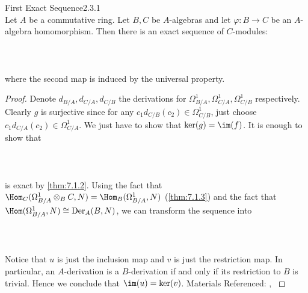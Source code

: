 \documentclass[a4paper]{article}
\begin{document}
\begin{thm}{First Exact Sequence}{2.3.1}\\
Let $A$ be a commutative ring. Let $B,C$ be $A$-algebras and let $\varphi:B\to C$ be an $A$-algebra homomorphism. Then there is an exact sequence of $C$-modules: \\~\\
 \\~\\
where the second map is induced by the universal property. 
\begin{proof}
Denote $d_{B/A},d_{C/A},d_{C/B}$ the derivations for $\Omega_{B/A}^1,\Omega_{C/A}^1,\Omega_{C/B}^1$ respectively. Clearly $g$ is surjective since for any $c_1d_{C/B}(c_2)\in\Omega_{C/B}^1$, just choose $c_1d_{C/A}(c_2)\in\Omega_{C/A}^1$. We just have to show that $\ker(g)=\im(f)$. It is enough to show that \\~\\
\\~\\
is exact by \ref{thm:7.1.2}. Using the fact that $\Hom_C(\Omega_{B/A}^1\otimes_BC,N)=\Hom_B(\Omega_{B/A}^1,N)$ (\ref{thm:7.1.3}) and the fact that $\Hom(\Omega_{B/A}^1,N)\cong\text{Der}_A(B,N)$, we can transform the sequence into \\~\\
\\~\\
Notice that $u$ is just the inclusion map and $v$ is just the restriction map. In particular, an $A$-derivation is a $B$-derivation if and only if its restriction to $B$ is trivial. Hence we conclude that $\im(u)=\ker(v)$. 
Materials Referenced: \cite{Liu}, \cite{CRing}
\end{proof}
\end{thm}
\end{document}

